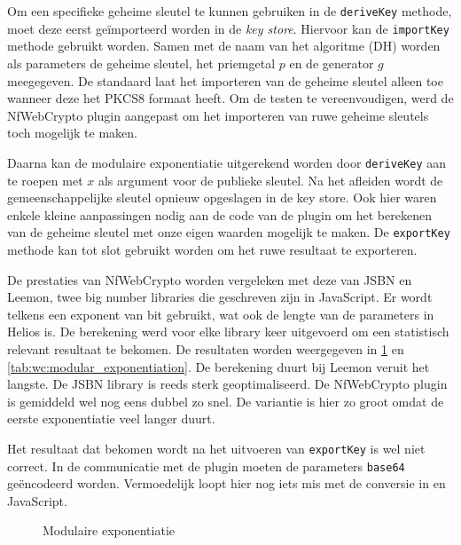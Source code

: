 \npar Om een specifieke geheime sleutel te kunnen gebruiken in de \texttt{deriveKey} methode, moet deze eerst ge\"importeerd worden in de \textit{key store}. Hiervoor kan de \texttt{importKey} methode gebruikt worden. Samen met de naam van het algoritme (DH) worden als parameters de geheime sleutel, het priemgetal $p$ en de generator $g$ meegegeven. De standaard laat het importeren van de geheime sleutel alleen toe wanneer deze het PKCS8 formaat heeft.\cite{rfc5208} Om de testen te vereenvoudigen, werd de NfWebCrypto plugin aangepast om het importeren van ruwe geheime sleutels toch mogelijk te maken.

\npar Daarna kan de modulaire exponentiatie uitgerekend worden door \texttt{deriveKey} aan te roepen met $x$ als argument voor de publieke sleutel. Na het afleiden wordt de gemeenschappelijke sleutel opnieuw opgeslagen in de key store. Ook hier waren enkele kleine aanpassingen nodig aan de code van de plugin om het berekenen van de geheime sleutel met onze eigen waarden mogelijk te maken. De \texttt{exportKey} methode kan tot slot gebruikt worden om het ruwe resultaat te exporteren. 

\npar De prestaties van NfWebCrypto worden vergeleken met deze van JSBN en Leemon, twee big number libraries die geschreven zijn in JavaScript.\cite{site:wu_rsa_and_ecc_in_javascript}\cite{site:baird_big_integers_in_javascript} Er wordt telkens een exponent van  bit gebruikt, wat ook de lengte van de parameters in Helios is. De berekening werd voor elke library  keer uitgevoerd om een statistisch relevant resultaat te bekomen. De resultaten worden weergegeven in \ref{fig:wc:modular_exponentiation} en \ref{tab:wc:modular_exponentiation}. De berekening duurt bij Leemon veruit het langste. De JSBN library is reeds sterk geoptimaliseerd. De NfWebCrypto plugin is gemiddeld wel nog eens dubbel zo snel. De variantie is hier zo groot omdat de eerste exponentiatie veel langer duurt.

\npar Het resultaat dat bekomen wordt na het uitvoeren van \texttt{exportKey} is wel niet correct. In de communicatie met de plugin moeten de parameters \texttt{base64} ge\"encodeerd worden. Vermoedelijk loopt hier nog iets mis met de conversie in \cplusplus en JavaScript.

\begin{figure}
  \caption{Modulaire exponentiatie}
  \label{fig:wc:modular_exponentiation}
\end{figure}

